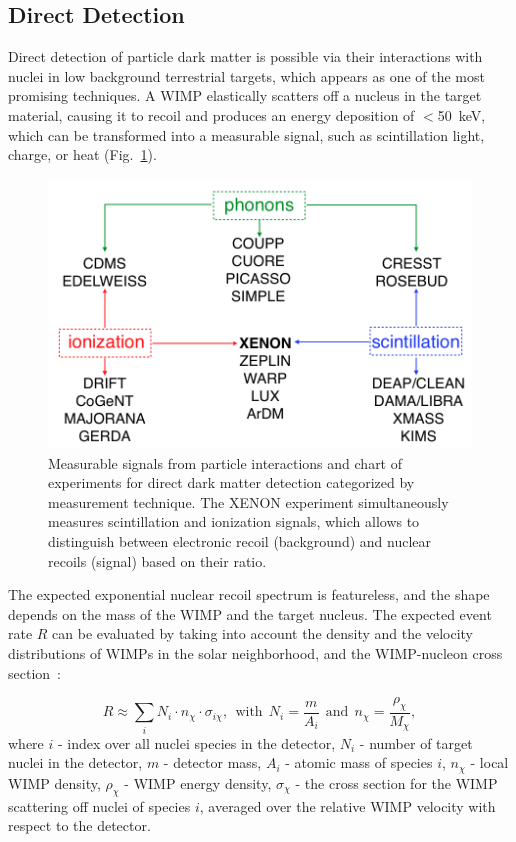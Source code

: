 \subsection{Direct Detection}
\label{DirectDetection}

Direct detection of particle dark matter is possible via their interactions with nuclei in low background terrestrial targets, which appears as one of the most promising techniques. A WIMP elastically scatters off a nucleus in the target material, causing it to recoil and produces an energy deposition of $<$50~keV, which can be transformed into a measurable signal, such as scintillation light, charge, or heat (Fig.~\ref{figDetectionSignals}).

\begin{figure}[!h]
\centering
\includegraphics[width=0.6\linewidth]{plots/DarkMatter/DetectionSignals2.png}
\caption[Measurable signals from a WIMP interaction and chart of experiments for direct dark matter detection categorized by measurement technique]{Measurable signals from particle interactions and chart of experiments for direct dark matter detection categorized by measurement technique. The XENON experiment simultaneously measures scintillation and ionization signals, which allows to distinguish between electronic recoil (background) and nuclear recoils (signal) based on their ratio.}
\label{figDetectionSignals}
\end{figure}

The expected exponential nuclear recoil spectrum is featureless, and the shape depends on the mass of the WIMP and the target nucleus. The expected event rate $R$ can be evaluated by taking into account the density and the velocity distributions of WIMPs in the solar neighborhood, and the WIMP-nucleon cross section~\cite{BertoneHooper}:

\begin{equation}
R \approx \sum_{i} N_{i} \cdot n_{\chi} \cdot \sigma_{i\chi},\  \ \text{with}\ \  N_{i} = \frac{m}{A_{i}}\ \ \text{and}\ \ n_{\chi} = \frac{\rho_{\chi}}{M_{\chi}},
\end{equation}
where 
$i$ - index over all nuclei species in the detector, 
$N_{i}$ - number of target nuclei in the detector, 
$m$ - detector mass, 
$A_{i}$ - atomic mass of species $i$, 
$n_{\chi}$ - local WIMP density, 
$\rho_{\chi}$ - WIMP energy density, 
$\sigma_{\chi}$ - the cross section for the WIMP scattering off nuclei of species $i$, averaged over the relative WIMP velocity with respect to the detector.

